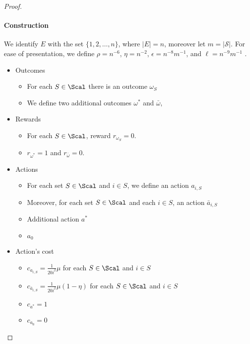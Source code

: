 \begin{proof}
	\paragraph{Construction}
	We identify $E$ with the set $\{1,2,\ldots, n\}$, where $|E|=n$, moreover let $m=|\mathcal{S}|$.
	For ease of presentation, we define  $\rho=n^{-6}$, $\eta=n^{-2}$, $\epsilon=n^{-8}m^{-1}$, and $\ell=n^{-9}m^{-1}$ . 
	\begin{itemize}
		\item Outcomes
		\begin{itemize}
		\item For each $S \in \Scal$ there is an outcome $\omega_{S}$ 
		\item We define two additional outcomes $\omega^*$ and $\bar \omega$,
		\end{itemize}
		
		\item Rewards
		\begin{itemize}
		\item  For each $S \in \Scal$, reward $r_{\omega_S}=0$. 
		\item $r_{\omega^*}=1$ and $r_{\bar \omega}=0$. 
		\end{itemize}
		
		\item Actions
		\begin{itemize}
			\item For each set $S\in \Scal$ and $i\in S$, we define an action $a_{i,S}$
			\item Moreover, for each set $S\in\Scal$ and each $i\in S$, an action $\bar a_{i,S}$
			\item Additional action $a^*$
			\item $a_0$
		\end{itemize}
		
		\item Action's cost
		\begin{itemize}
			\item $c_{a_{i, S}}=\frac{1}{20 i^2}\mu$ for each $S\in\Scal$ and $i\in S$
			\item $c_{\bar a_{i, S}}=\frac{1}{20 i^2}\mu(1-\eta)$ for each $S\in\Scal$ and $i\in S$
			\item $c_{a^*}=1$
			\item $c_{a_0}=0$
		\end{itemize}
		

\end{itemize}
\end{proof}

